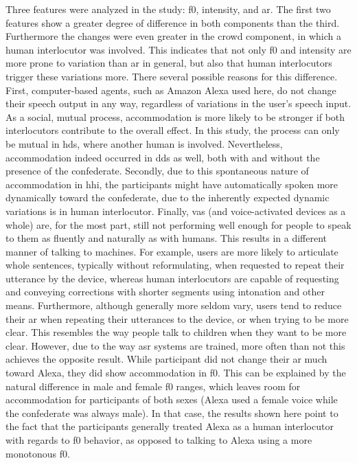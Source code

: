 Three features were analyzed in the study: \acf{f0}, intensity, and \acf{ar}.
The first two features show a greater degree of difference in both components than the third.
Furthermore the changes were even greater in the crowd component, in which a human interlocutor was involved.
This indicates that not only \ac{f0} and intensity are more prone to variation than \ac{ar} in general, but also that human interlocutors trigger these variations more.
There several possible reasons for this difference.
First, computer-based agents, such as Amazon Alexa used here, do not change their speech output in any way, regardless of variations in the user's speech input.
As a social, mutual process, accommodation is more likely to be stronger if both interlocutors contribute to the overall effect.
In this study, the process can only be mutual in \ac{hds}, where another human is involved.
Nevertheless, accommodation indeed occurred in \ac{dds} as well, both with and without the presence of the confederate.
Secondly, due to this spontaneous nature of accommodation in \ac{hhi}, the participants might have automatically spoken more dynamically toward the confederate, due to the inherently expected dynamic variations is in human interlocutor.
Finally, \acp{va} (and voice-activated devices as a whole) are, for the most part, still not performing well enough for people to speak to them as fluently and naturally as with humans.
This results in a different manner of talking to machines.
For example, users are more likely to articulate whole sentences, typically without reformulating, when requested to repeat their utterance by the device, whereas human interlocutors are capable of requesting and conveying corrections with shorter segments using intonation and other means.
Furthermore, although generally more seldom vary, users tend to reduce their \ac{ar} when repeating their utterances to the device, or when trying to be more clear.
This resembles the way people talk to children when they want to be more clear.
However, due to the way \ac{asr} systems are trained, more often than not this achieves the opposite result.
While participant did not change their \ac{ar} much toward Alexa, they did show accommodation in \ac{f0}.
This can be explained by the natural difference in male and female \ac{f0} ranges, which leaves room for accommodation for participants of both sexes (Alexa used a female voice while the confederate was always male).
In that case, the results shown here point to the fact that the participants generally treated Alexa as a human interlocutor with regards to \ac{f0} behavior, as opposed to talking to Alexa using a more monotonous \ac{f0}.
